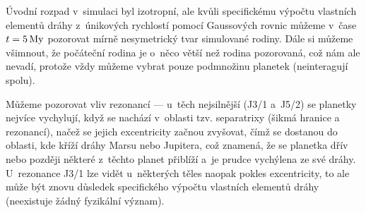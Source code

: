 \documentclass[A4paper, 12pt, oneside]{book}
\begin{document}
Úvodní rozpad v~simulaci byl izotropní, ale kvůli specifickému výpočtu vlastních elementů dráhy z~únikových rychlostí pomocí Gaussových rovnic můžeme v~čase $t=5\,{\rm My}$ pozorovat mírně nesymetrický tvar simulované rodiny. Dále si můžeme všimnout, že počáteční rodina je o~něco větší než rodina pozorovaná, což nám ale nevadí, protože vždy můžeme vybrat pouze podmnožinu planetek (neinteragují spolu).

Můžeme pozorovat vliv rezonancí --- u~těch nejsilnější (J3/1 a~J5/2) se planetky nejvíce vychylují, když se nachází v~oblasti tzv. separatrixy (šikmá hranice  a~ rezonancí), načež se jejich excentricity začnou zvyšovat, čímž se dostanou do oblasti, kde kříží dráhy Marsu nebo Jupitera, což znamená, že se planetka dřív nebo později některé z~těchto planet přiblíží a~je prudce vychýlena ze své dráhy. U~rezonance J3/1 lze vidět u~některých těles naopak pokles excentricity, to ale může být znovu důsledek specifického výpočtu vlastních elementů dráhy (neexistuje žádný fyzikální význam).
\end{document}
